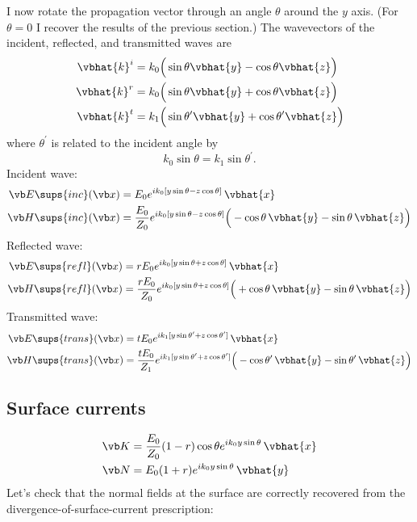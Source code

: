 \documentclass{article}
\begin{document}
I now rotate the propagation vector through an angle $\theta$ around
the $y$ axis. (For $\theta=0$ I recover the results of the previous
section.)
The wavevectors of the incident, reflected, and transmitted waves
are 
\begin{align*}
 \vbhat{k}^i &= k_0\Big( \sin\theta \vbhat{y} - \cos\theta\vbhat{z} \Big) \\
 \vbhat{k}^r &= k_0\Big( \sin\theta \vbhat{y} + \cos\theta\vbhat{z} \Big) \\
 \vbhat{k}^t &= k_1\Big( \sin\theta^\prime \vbhat{y} + \cos\theta^\prime\vbhat{z} \Big)\\
\end{align*}
where $\theta^\prime$ is related to the incident angle by 
$$ k_0\sin\theta = k_1 \sin \theta^\prime. $$
%
Incident wave:
%
\begin{align}
\vb E\sups{inc}(\vb x) 
 &= E_0 e^{ik_0[y\sin\theta - z\cos\theta ]} \, \vbhat{x} 
\\
\vb H\sups{inc}(\vb x) 
 &= \frac{E_0}{Z_0} 
    e^{ik_0[y\sin\theta  - z\cos\theta]} 
    \Big( -\cos\theta\,\vbhat{y} - \sin\theta\,\vbhat{z}\Big)
\label{NonNormalIncidentEPerp}
\end{align}
%
Reflected wave:
%
\begin{align}
\vb E\sups{refl}(\vb x)
 &= rE_0 e^{ik_0[y\sin\theta  + z\cos\theta]} \, \vbhat{x} 
\\
\vb H\sups{refl}(\vb x)
 &= \frac{rE_0}{Z_0} 
    e^{ik_0[y\sin\theta  + z\cos\theta ]}
    \Big( +\cos\theta\,\vbhat{y} - \sin\theta\,\vbhat{z}\Big)
\label{NonNormalReflectedEPerp}
\end{align}
%
Transmitted wave:
%
\begin{align*}
\vb E\sups{trans}(\vb x)
 &= tE_0 e^{ik_1[y\sin\theta^\prime  + z\cos\theta^\prime]} \, \vbhat{x} 
\\
\vb H\sups{trans}(\vb x)
 &= \frac{tE_0}{Z_1} 
    e^{ik_1[y\sin\theta^\prime  + z\cos\theta^\prime]}
    \Big( -\cos\theta^\prime\,\vbhat{y} - \sin\theta^\prime\,\vbhat{z}\Big)
\label{NonNormalTransmittedEPerp}
\end{align*}

\subsection*{Surface currents}

\begin{align*}
  \vb K &= \frac{E_0}{Z_0} (1-r)\cos\theta e^{ik_0 y \sin \theta} 
            \, \vbhat{x} 
\\
  \vb N &= E_0 (1+r) e^{ik_0 y \sin \theta} \, \vbhat{y} 
\end{align*}
%
Let's check that the normal fields at the surface are 
correctly recovered from the divergence-of-surface-current 
prescription:
\end{document}
